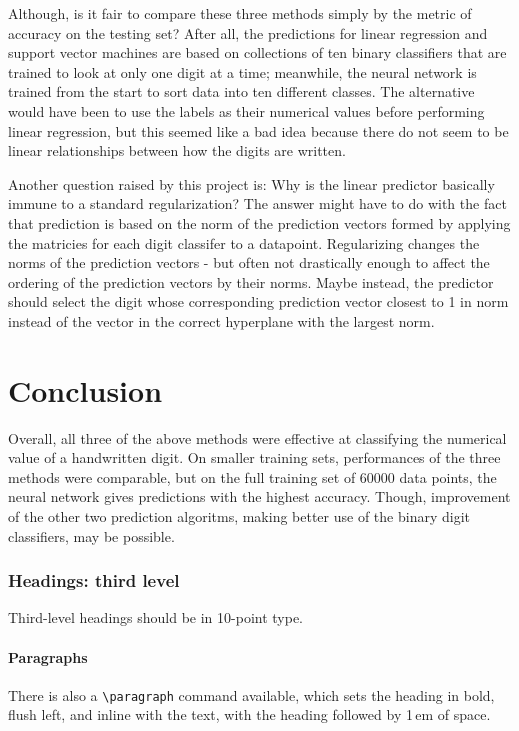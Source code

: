 \documentclass{article}
\begin{document}
Although, is it fair to compare these three methods simply by the metric of accuracy on the testing set? After all, the predictions for linear regression and support vector machines are based on collections of ten binary classifiers that are trained to look at only one digit at a time; meanwhile, the neural network is trained from the start to sort data into ten different classes. The alternative would have been to use the labels as their numerical values before performing linear regression, but this seemed like a bad idea because there do not seem to be linear relationships between how the digits are written. 

Another question raised by this project is: Why is the linear predictor basically immune to a standard regularization? The answer might have to do with the fact that prediction is based on the norm of the prediction vectors formed by applying the matricies for each digit classifer to a datapoint. Regularizing changes the norms of the prediction vectors - but often not drastically enough to affect the ordering of the prediction vectors by their norms. Maybe instead, the predictor should select the digit whose corresponding prediction vector closest to 1 in norm instead of the vector in the correct hyperplane with the largest norm.


\section{Conclusion} Overall, all three of the above methods were effective at classifying the numerical value of a handwritten digit. On smaller training sets, performances of the three methods were comparable, but on the full training set of 60000 data points, the neural network gives predictions with the highest accuracy. Though, improvement of the other two prediction algoritms, making better use of the binary digit classifiers, may be possible.

\subsubsection{Headings: third level}

Third-level headings should be in 10-point type.

\paragraph{Paragraphs}

There is also a \verb+\paragraph+ command available, which sets the heading in
bold, flush left, and inline with the text, with the heading followed by 1\,em
of space.
\end{document}
